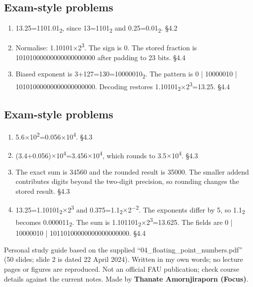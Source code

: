 \documentclass[11pt]{article}
\begin{document}
\begin{keepsection}\subsection{Exam-style problems}

\begin{enumerate}
\item 13.25=1101.01\textsubscript{2}, since 13=1101\textsubscript{2} and 0.25=0.01\textsubscript{2}. \hfill{\small\color{FAUblue}§4.2}
\item Normalise: 1.10101\ensuremath{\times}2\textsuperscript{3}. The sign is 0. The stored fraction is 10101000000000000000000 after padding to 23 bits. \hfill{\small\color{FAUblue}§4.4}
\item Biased exponent is 3+127=130=10000010\textsubscript{2}. The pattern is 0 | 10000010 | 10101000000000000000000. Decoding restores 1.10101\textsubscript{2}\ensuremath{\times}2\textsuperscript{3}=13.25. \hfill{\small\color{FAUblue}§4.4}
\end{enumerate}

\end{keepsection}
\begin{keepsection}\subsection{Exam-style problems}

\begin{enumerate}
\item 5.6\ensuremath{\times}10\textsuperscript{2}=0.056\ensuremath{\times}10\textsuperscript{4}. \hfill{\small\color{FAUblue}§4.3}
\item (3.4+0.056)\ensuremath{\times}10\textsuperscript{4}=3.456\ensuremath{\times}10\textsuperscript{4}, which rounds to 3.5\ensuremath{\times}10\textsuperscript{4}. \hfill{\small\color{FAUblue}§4.3}
\item The exact sum is 34560 and the rounded result is 35000. The smaller addend contributes digits beyond the two-digit precision, so rounding changes the stored result. \hfill{\small\color{FAUblue}§4.3}
\item 13.25=1.10101\textsubscript{2}\ensuremath{\times}2\textsuperscript{3} and 0.375=1.1\textsubscript{2}\ensuremath{\times}2\textsuperscript{\ensuremath{-}2}. The exponents differ by 5, so 1.1\textsubscript{2} becomes 0.000011\textsubscript{2}. The sum is 1.101101\textsubscript{2}\ensuremath{\times}2\textsuperscript{3}=13.625. The fields are 0 | 10000010 | 10110100000000000000000. \hfill{\small\color{FAUblue}§4.4}
\end{enumerate}

\end{keepsection}

\vfill{\small Personal study guide based on the supplied “04\_floating\_point\_numbers.pdf” (50 slides; slide 2 is dated 22 April 2024). Written in my own words; no lecture pages or figures are reproduced. Not an official FAU publication; check course details against the current notes. Made by \textbf{Thanate Amornjiraporn (Focus)}.}
\end{document}
